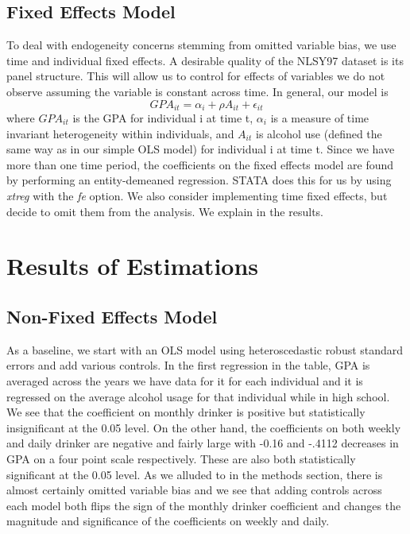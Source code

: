 \documentclass[11pt]{article}
\begin{document}
\subsection*{Fixed Effects Model}
To deal with endogeneity concerns stemming from omitted variable bias, we use time and individual fixed effects. A desirable quality of the NLSY97 dataset is its panel structure. This will allow us to control for effects of variables we do not observe assuming the variable is constant across time. In general, our model is
\begin{equation*}
    GPA_{it} = \alpha_i + \rho A_{it} + \epsilon_{it}
\end{equation*}
where $GPA_{it}$ is the GPA for individual i at time t, $\alpha_i$ is a measure of time invariant heterogeneity within individuals, and $A_{it}$ is alcohol use (defined the same way as in our simple OLS model) for individual i at time t. Since we have more than one time period, the coefficients on the fixed effects model are found by performing an entity-demeaned regression. STATA does this for us by using \textit{xtreg} with the \textit{fe} option. We also consider implementing time fixed effects, but decide to omit them from the analysis. We explain in the results.


\section*{Results of Estimations}

\subsection*{Non-Fixed Effects Model}

As a baseline, we start with an OLS model using heteroscedastic robust standard errors and add various controls. In the first regression in the table, GPA is averaged across the years we have data for it for each individual and it is regressed on the average alcohol usage for that individual while in high school. We see that the coefficient on monthly drinker is positive but statistically insignificant at the 0.05 level. On the other hand, the coefficients on both weekly and daily drinker are negative and fairly large with -0.16 and -.4112 decreases in GPA on a four point scale respectively. These are also both statistically significant at the 0.05 level. As we alluded to in the methods section, there is almost certainly omitted variable bias and we see that adding controls across each model both flips the sign of the monthly drinker coefficient and changes the magnitude and significance of the coefficients on weekly and daily. 
\end{document}
